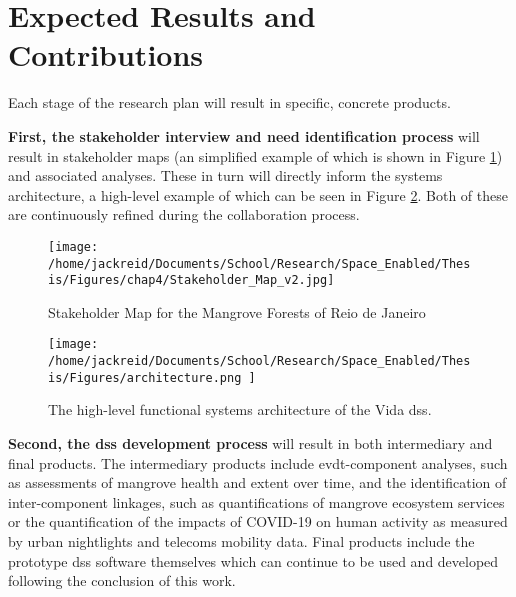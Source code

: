 \documentclass[notitlepage]{article}
\begin{document}
\section{Expected Results and Contributions}

Each stage of the research plan will result in specific, concrete products.

\textbf{First, the stakeholder interview and need identification process} will result in stakeholder maps (an simplified example of which is shown in Figure \ref{fig:rio_stakemap}) and associated analyses. These in turn will directly inform the systems architecture, a high-level example of which can be seen in Figure \ref{fig:architecture}. Both of these are continuously refined during the collaboration process.

\begin{figure}[h]
	\centering
	\texttt{[image: /home/jackreid/Documents/School/Research/Space\_Enabled/Thesis/Figures/chap4/Stakeholder\_Map\_v2.jpg]}
	\caption[Stakeholder Map for the Mangrove Forests of Reio de Janeiro]{Stakeholder Map for the Mangrove Forests of Reio de Janeiro}
	\label{fig:rio_stakemap}
\end{figure}

\begin{figure}[h]
	\centering
	\texttt{[image: /home/jackreid/Documents/School/Research/Space\_Enabled/Thesis/Figures/architecture.png
]}
	\caption{The high-level functional systems architecture of the Vida \ac{dss}.}
	\label{fig:architecture}
\end{figure}


\textbf{Second, the \ac{dss} development process} will result in both intermediary and final products. The intermediary products include \ac{evdt}-component analyses, such as assessments of mangrove health and extent over time, and the identification of inter-component linkages, such as quantifications of mangrove ecosystem services or the quantification of the impacts of COVID-19 on human activity as measured by urban nightlights and telecoms mobility data. Final products include the prototype \ac{dss} software themselves which can continue to be used and developed following the conclusion of this work.
\end{document}
